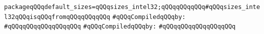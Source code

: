 \label{src/app/c-glue-maker/default-sizes-intel32.pkg}
\verb|packageqQQqdefault_sizes=qQQqsizes_intel32;qQQqqQQqqQQq#qQQqsizes_intel32qQQqisqQQqfromqQQqqQQqqQQq|\newline
\verb|#qQQqCompiledqQQqby:|\newline
\verb|#qQQqqQQqqQQqqQQqqQQq|\newline
\newline
\verb|#qQQqCompiledqQQqby:|\newline
\verb|#qQQqqQQqqQQqqQQqqQQq|\newline
\newline

